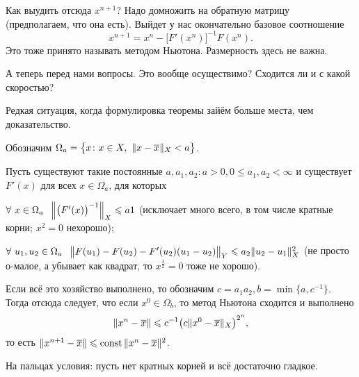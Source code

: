 Как выудить отсюда $x^{n+1}$? Надо домножить на обратную матрицу (предполагаем, что она есть). Выйдет у нас окончательно базовое соотношение
\[
  x^{n+1} = x^n - \big[F'(x^n)\big]^{-1}F(x^n).
\]
Это тоже принято называть методом Ньютона. Размерность здесь не важна.

А теперь перед нами вопросы. Это вообще осуществимо? Сходится ли и с какой скоростью?

Редкая ситуация, когда формулировка теоремы зайём больше места, чем доказательство.

Обозначим $\Omega_a = \big\{x\colon x\in X,\ \|x-\overline{x}\|_X<a\big\}$.
\begin{The}
Пусть существуют такие постоянные $a,a_1,a_2\colon a>0, 0\le a_1,a_2<\infty$ и существует $F'(x)$ для всех $x\in \Omega_a$, для которых
\begin{roItems}
\item $\forall\ x\in \Omega_a\hskip .75em plus.1em minus.08em\relax \Big\|\big(F'(x)\big)^{-1}\Big\|_X \leqslant a1$ (исключает много всего, в том числе кратные корни; $x^2=0$ нехорошо);\\
\item $\forall\ u_1,u_2\in \Omega_a\hskip .75em plus.1em minus.08em\relax 
\big\|F(u_1) - F(u_2) - F'(u_2)(u_1-u_2) \big\|_Y \leqslant a_2\|u_2 - u_1\|_X^2$ (не просто о-малое, а убывает как квадрат, то $x^{\frac32}=0$ тоже не хорошо).
\end{roItems}
Если всё это хозяйство выполнено, то обозначим $c = a_1a_2, b = \min\{a,c^{-1}\}$. Тогда отсюда следует, что если $x^0\in \Omega_b$, то метод Ньютона сходится и выполнено 
\[
  \|x^n-\overline{x}\| \leqslant c^{-1}\big(c\|x^0-\overline{x}\|_X\big)^{2^n},
\]
то есть $\|x^{n+1} - \overline{x}\| \leqslant \operatorname{const} \|x^n-\overline{x}\|^2$.
\end{The}
На пальцах условия: пусть нет кратных корней и всё достаточно гладкое.
